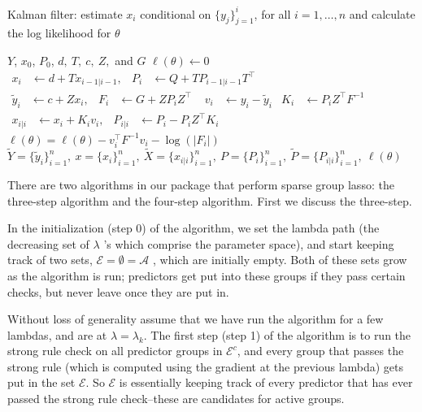 \documentclass[titlepage]{article}
\begin{document}
\begin{algorithm}
  \caption{Kalman filter: estimate $x_i$ conditional on
    $\{y_j\}_{j=1}^i$, for all $i=1,\ldots,n$ and calculate the log likelihood
    for $\theta$\label{alg:kalman}}
  \begin{algorithmic}
     $Y$, $x_0$, $P_0$, $d,\ T,\ c,\ Z,$ and $G$
    \STATE $\ell(\theta) \leftarrow 0$ 
    \STATE $\begin{aligned} x_{i}
      &\leftarrow d + T x_{i-1|i-1}, & P_i &\leftarrow Q + T P_{i-1|i-1}
      T^\top\end{aligned}$ 
    \STATE $\begin{aligned}\widetilde{y}_i
      &\leftarrow c + Z  x_i, & F_i &\leftarrow G + Z P_i
      Z^\top\end{aligned}$ 
    \STATE $\begin{aligned}v_i&\leftarrow y_i-\widetilde{y}_i& K_i&
      \leftarrow P_i Z^\top F^{-1}\end{aligned}$ 
    \STATE $\begin{aligned} x_{i|i}
      &\leftarrow  x_i + K_i v_i, & P_{i|i} &\leftarrow P_i - P_iZ^\top
      K_i\end{aligned}$ 
    \STATE $\ell(\theta) = \ell(\theta) -v_i^\top F^{-1}v_i - \log(|F_i|)$
    \ENDFOR
    \RETURN $\widetilde{Y}=\{\widetilde{y}_i\}_{i=1}^n,\  x=\{ x_i\}_{i=1}^n,\
    \widetilde{X}=\{x_{i|i}\}_{i=1}^n,\ P=\{P_i\}_{i=1}^n,\
    \widetilde{P}=\{P_{i|i}\}_{i=1}^n,\ \ell(\theta)$
  \end{algorithmic}
\end{algorithm}


There are two algorithms in our package that perform sparse group lasso: the three-step algorithm and the four-step algorithm. First we discuss the three-step.

In the initialization (step 0) of the algorithm, we set the lambda path (the decreasing set of $\lambda$ 's which comprise the parameter space), and start keeping track of two sets, $\mathcal{E} = \emptyset = \mathcal{A}$ , which are initially empty. Both of these sets grow as the algorithm is run; predictors get put into these groups if they pass certain checks, but never leave once they are put in.

Without loss of generality assume that we have run the algorithm for a few lambdas, and are at $\lambda = \lambda_{k}$. The first step (step 1) of the algorithm is to run the strong rule check on all predictor groups in $\mathcal{E}^c$, and every group that passes the strong rule (which is computed using the gradient at the previous lambda) gets put in the set $\mathcal{E}$. So $\mathcal{E}$ is essentially keeping track of every predictor that has ever passed the strong rule check--these are candidates for active groups.
\end{document}
